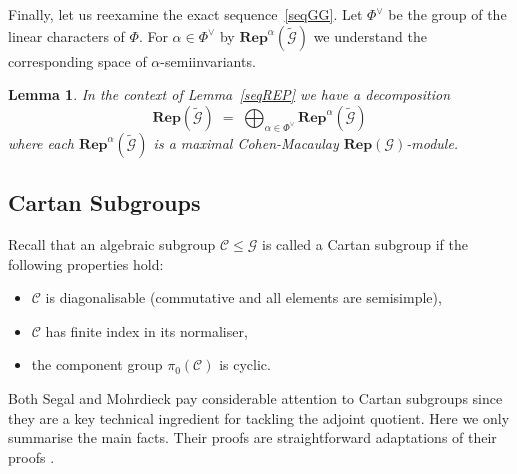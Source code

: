 \documentclass[10pt]{article}
\newcommand{\Rep}{\mathbf{Rep}}
\newtheorem{lem}{Lemma}
\theoremstyle{definition}
\theoremstyle{remark}
\newcommand{\cC}{{{\mathcal C}}}
\newcommand{\cG}{{{\mathcal G}}}
\newcommand{\wG}{{\widetilde{\cG}}}
\begin{document}
Finally, let us reexamine the exact sequence~\eqref{seqGG}. Let $\Phi^\vee$ be the group of the linear characters of $\Phi$.
For $\alpha\in\Phi^\vee$ by $\Rep^\alpha (\wG)$ we understand the corresponding space of $\alpha$-semiinvariants.
\begin{lem}
\label{lem3}
 In the context of Lemma~\ref{seqREP}
  we have a decomposition
  \begin{equation}
    \Rep (\wG) \;=\; \bigoplus_{\alpha\in\Phi^{\vee}} \Rep^{\alpha} (\wG)
\end{equation}
  where each $\Rep^{\alpha} (\wG)$ is a maximal Cohen-Macaulay $\Rep (\cG)$-module.
\end{lem}

\subsection{Cartan Subgroups}
\label{subsection appendix Cartan subgroups}
Recall that an algebraic subgroup $\cC\leq \cG$ is called a Cartan subgroup if the following
properties hold:
\begin{itemize}
\item  $\cC$ is diagonalisable (commutative and all elements are semisimple),
\item $\cC$ has finite index in its normaliser,
\item the component group $\pi_0 (\cC)$ is cyclic.
\end{itemize}
Both Segal \cite{Segal} and  Mohrdieck \cite{diss} pay considerable attention to Cartan subgroups since they are a key technical ingredient for tackling
the adjoint quotient. Here we only summarise the main facts. Their proofs are straightforward adaptations of their proofs \cite{diss,Segal}.
\end{document}
